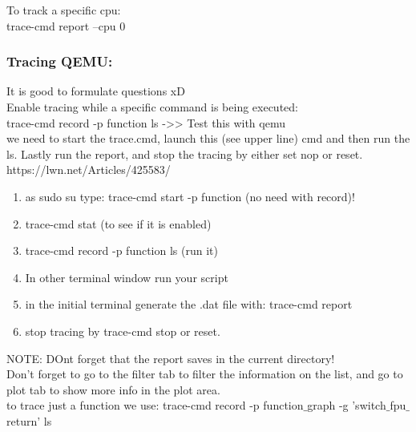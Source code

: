 \documentclass[11pt, a4paper, oneside]{article}
\theoremstyle{definition}
\begin{document}
To track a specific cpu:\\
trace-cmd report --cpu 0\\


\subsubsection{Tracing QEMU:}
It is good to formulate questions xD\\
Enable tracing while a specific command is being executed:\\
trace-cmd record -p function ls ->> Test this with qemu\\
we need to start the trace.cmd, launch this (see upper line) cmd and then run the ls. Lastly run the report, and stop the tracing by either set nop or reset.\\
https://lwn.net/Articles/425583/\\
\begin{enumerate}
	\item as sudo su type: trace-cmd start -p function (no need with record)!
	\item trace-cmd stat (to see if it is enabled)
	\item trace-cmd record -p function ls (run it)
	\item In other terminal window run your script
	\item in the initial terminal generate the .dat file with: trace-cmd report
	\item stop tracing by trace-cmd stop or reset.
\end{enumerate}

NOTE: DOnt forget that the report saves in the current directory!\\

Don't forget to go to the filter tab to filter the information on the list, and go to plot tab to show more info in the plot area.\\

to trace just a function we use:
trace-cmd record -p function$\_$graph -g 'switch$\_$fpu$\_$return' ls\\
\end{document}
